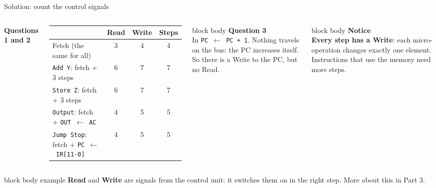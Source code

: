 \documentclass[aspectratio=169,10pt]{beamer}
\newcommand{\stepbox}[2]{%
  \begin{beamercolorbox}[rounded=true,sep=0.09cm,wd=\linewidth]{block body}
    \footnotesize\textbf{#1}\\ #2
  \end{beamercolorbox}\vspace{0.06cm}}
\newcommand{\keymsg}[1]{%
  \begin{beamercolorbox}[rounded=true,sep=0.1cm,wd=\textwidth]{block body example}
    \centering\footnotesize #1
  \end{beamercolorbox}}
\newcommand{\mo}[2]{\texttt{#1\,$\leftarrow$\,#2}}
\begin{document}
\begin{frame}{Solution: count the control signals}
  \begin{columns}[c,onlytextwidth]
      \centering
      \footnotesize\textbf{Questions 1 and 2}\\[0.1cm]
      \scriptsize
      \renewcommand{\arraystretch}{1.25}
      \begin{tabular}{lccc}
        \toprule
        & \textcolor{ReadBlue}{\textbf{Read}} & \textcolor{WriteRed}{\textbf{Write}} & \textbf{Steps} \\
        \midrule
        Fetch (the same for all) & 3 & 4 & 4 \\
        \midrule
        \texttt{Add Y}: fetch + 3 steps & 6 & 7 & 7 \\
        \texttt{Store Z}: fetch + 3 steps & 6 & 7 & 7 \\
        \texttt{Output}: fetch + \mo{OUT}{AC} & 4 & 5 & 5 \\
        \texttt{Jump Stop}: fetch + \mo{PC}{IR[11-0]} & 4 & 5 & 5 \\
        \bottomrule
      \end{tabular}
      \stepbox{Question 3}{In \mo{PC}{PC + 1}. Nothing travels on the bus: the PC increases itself.
        So there is a Write to the PC, but no Read.}
      \stepbox{Notice}{\textbf{Every step has a Write}: each micro-operation changes exactly one element.
        Instructions that use the memory need more steps.}
  \end{columns}
  \vfill
  \keymsg{\textbf{Read} and \textbf{Write} are signals from the control unit: it switches them on in the right step.
    More about this in Part 3.}
\end{frame}
\end{document}
